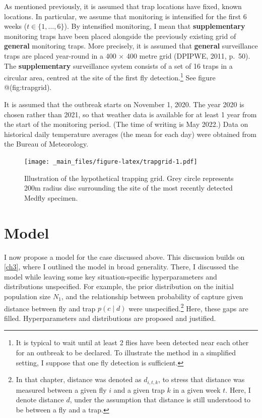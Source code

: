\documentclass[
  oneside]{book}
\begin{document}
As mentioned previously, it is assumed that trap locations have fixed, known locations. In particular, we assume that monitoring is intensified for the first 6 weeks (\(t \in \{1, \ldots, 6\}\)). By intensified monitoring, I mean that \textbf{supplementary} monitoring traps have been placed alongside the previously existing grid of \textbf{general} monitoring traps. More precisely, it is assumed that \textbf{general} surveillance traps are placed year-round in a 400 \(\times\) 400 metre grid (DPIPWE, 2011, p.~50). The \textbf{supplementary} surveillance system consists of a set of 16 traps in a circular area, centred at the site of the first fly detection.\footnote{It is typical to wait until at least 2 flies have been detected near each other for an outbreak to be declared. To illustrate the method in a simplified setting, I suppose that one fly detection is sufficient.} See figure @(fig:trapgrid).

It is assumed that the outbreak starts on November 1, 2020. The year 2020 is chosen rather than 2021, so that weather data is available for at least 1 year from the start of the monitoring period. (The time of writing is May 2022.) Data on historical daily temperature averages (the mean for each day) were obtained from the Bureau of Meteorology.

\begin{figure}
\centering
\texttt{[image: \_main\_files/figure-latex/trapgrid-1.pdf]}
\caption{\label{fig:trapgrid}Illustration of the hypothetical trapping grid. Grey circle represents 200m radius disc surrounding the site of the most recently detected Medfly specimen.}
\end{figure}

\hypertarget{model}{%
\section{Model}\label{model}}

I now propose a model for the case discussed above. This discussion builds on \ref{ch3}, where I outlined the model in broad generality. There, I discussed the model while leaving some key situation-specific hyperparameters and distributions unspecified. For example, the prior distribution on the initial population size \(N_1\), and the relationship between probability of capture given distance between fly and trap \(p(c \mid d)\) were unspecified.\footnote{In that chapter, distance was denoted as \(d_{i,t,k}\), to stress that distance was measured between a given fly \(i\) and a given trap \(k\) in a given week \(t\). Here, I denote distance \(d\), under the assumption that distance is still understood to be between a fly and a trap.} Here, these gaps are filled. Hyperparameters and distributions are proposed and justified.
\end{document}
